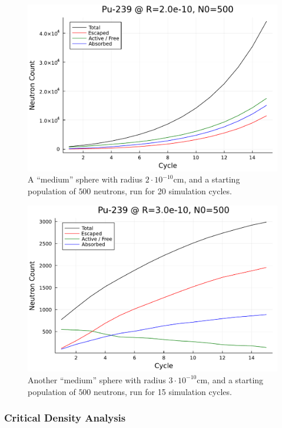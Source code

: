 \begin{figure}[h!]
    \centering
    \includegraphics[scale=0.55]{imgs/neutron-count-plutonium-medium.pdf}
    \caption{A ``medium'' sphere with radius $2 \cdot 10^{-10}$cm, and a starting population of $500$ neutrons, run for 20 simulation 
    cycles.}
\end{figure}

\begin{figure}[h!]
    \centering
    \includegraphics[scale=0.55]{imgs/neutron-count-plutonium-medium-2.pdf}
    \caption{Another ``medium'' sphere with radius $3 \cdot 10^{-10}$cm, and a starting population of $500$ neutrons, run for 15 simulation 
    cycles.}
\end{figure}\newpage

\subsubsection{Critical Density Analysis}

